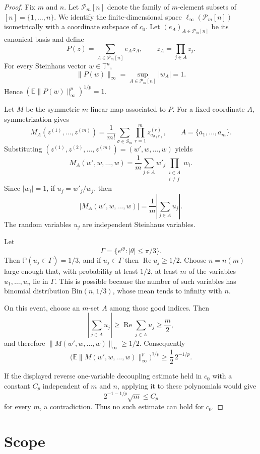 \documentclass[11pt]{article}
\newcommand{\E}{\mathbb E}
\newcommand{\Pcal}{\mathcal P}
\newcommand{\T}{\mathbb T}
\begin{document}
\begin{proof}
Fix \(m\) and \(n\). Let \(\Pcal_m[n]\) denote the family of \(m\)-element
subsets of \([n]=\{1,\ldots,n\}\). We identify the finite-dimensional space
\(\ell_\infty(\Pcal_m[n])\) isometrically with a coordinate subspace of
\(c_0\). Let \((e_A)_{A\in\Pcal_m[n]}\) be its canonical basis and define
\[
  P(z)=\sum_{A\in\Pcal_m[n]} e_A z_A,
  \qquad z_A=\prod_{j\in A} z_j .
\]
For every Steinhaus vector \(w\in\T^n\),
\[
  \|P(w)\|_\infty=\sup_{A\in\Pcal_m[n]} |w_A|=1.
\]
Hence \((\E\|P(w)\|_\infty^p)^{1/p}=1\).

Let \(M\) be the symmetric \(m\)-linear map associated to \(P\). For a fixed
coordinate \(A\), symmetrization gives
\[
  M_A(z^{(1)},\ldots,z^{(m)})
  =\frac1{m!}\sum_{\sigma\in S_m}
      \prod_{r=1}^m z^{(r)}_{a_{\sigma(r)}},
  \qquad A=\{a_1,\ldots,a_m\}.
\]
Substituting \((z^{(1)},z^{(2)},\ldots,z^{(m)})=(w',w,\ldots,w)\) yields
\[
  M_A(w',w,\ldots,w)
  =\frac1m\sum_{j\in A} w'_j\prod_{\substack{i\in A\\ i\ne j}}w_i.
\]
Since \(|w_i|=1\), if \(u_j=w'_j/w_j\), then
\[
  |M_A(w',w,\ldots,w)|
  =\frac1m\left|\sum_{j\in A}u_j\right|.
\]
The random variables \(u_j\) are independent Steinhaus variables.

Let
\[
  \Gamma=\{e^{i\theta}:|\theta|\le \pi/3\}.
\]
Then \(\mathbb P(u_j\in\Gamma)=1/3\), and if \(u_j\in\Gamma\) then
\(\operatorname{Re}u_j\ge 1/2\). Choose \(n=n(m)\) large enough that, with
probability at least \(1/2\), at least \(m\) of the variables
\(u_1,\ldots,u_n\) lie in \(\Gamma\). This is possible because the number of
such variables has binomial distribution \(\mathrm{Bin}(n,1/3)\), whose mean
tends to infinity with \(n\).

On this event, choose an \(m\)-set \(A\) among those good indices. Then
\[
  \left|\sum_{j\in A}u_j\right|
  \ge \operatorname{Re}\sum_{j\in A}u_j
  \ge \frac m2,
\]
and therefore \(\|M(w',w,\ldots,w)\|_\infty\ge 1/2\). Consequently
\[
  \big(\E\|M(w',w,\ldots,w)\|_\infty^p\big)^{1/p}
  \ge \frac12\,2^{-1/p}.
\]

If the displayed reverse one-variable decoupling estimate held in \(c_0\)
with a constant \(C_p\) independent of \(m\) and \(n\), applying it to these
polynomials would give
\[
  2^{-1-1/p}\sqrt m \le C_p
\]
for every \(m\), a contradiction. Thus no such estimate can hold for \(c_0\).
\end{proof}

\section*{Scope}
\end{document}
